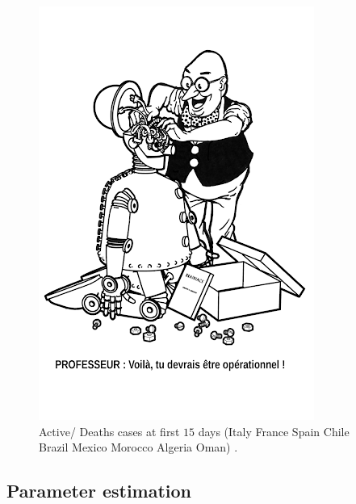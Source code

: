 \documentclass[final,a4paper,reqno]{elsarticle}
\numberwithin{equation}{section}
\begin{document}
\begin{figure}[H]\label{Fig0}
	\centering
		\includegraphics[scale=0.4]{ch.png}
					
	\caption{Active/ Deaths cases at first $15$ days (Italy France Spain Chile Brazil Mexico Morocco Algeria Oman)   .}
\end{figure}



\subsection{ Parameter estimation}
\end{document}
